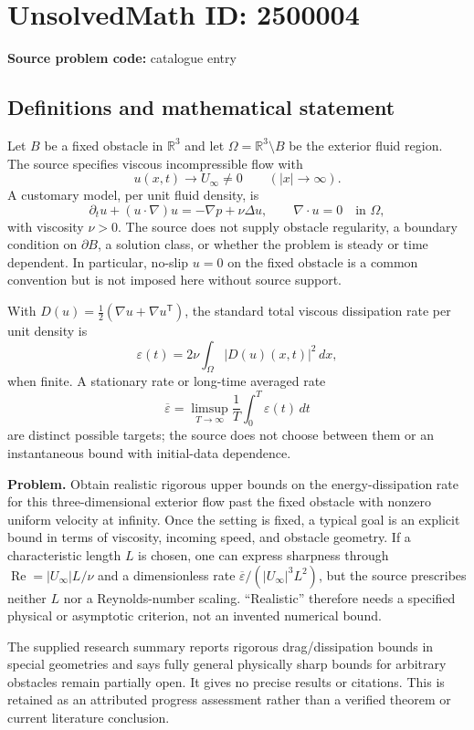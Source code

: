 \documentclass[11pt]{article}
\newcommand{\R}{\mathbb{R}}
\begin{document}
\section*{UnsolvedMath ID: 2500004}
\textbf{Source problem code:} catalogue entry
\subsection{Definitions and mathematical statement}
Let $B$ be a fixed obstacle in $\R^3$ and let $\Omega=\R^3\setminus B$ be the exterior fluid region. The source specifies viscous incompressible flow with
\[
 u(x,t)\longrightarrow U_\infty\ne0\qquad(|x|\to\infty).
\]
A customary model, per unit fluid density, is
\[
 \partial_tu+(u\cdot\nabla)u=-\nabla p+\nu\Delta u,
 \qquad\nabla\cdot u=0\quad\text{in }\Omega,
\]
with viscosity $\nu>0$. The source does not supply obstacle regularity, a boundary condition on $\partial B$, a solution class, or whether the problem is steady or time dependent. In particular, no-slip $u=0$ on the fixed obstacle is a common convention but is not imposed here without source support.

With $D(u)=\tfrac12(\nabla u+\nabla u^{\mathsf T})$, the standard total viscous dissipation rate per unit density is
\[
 \varepsilon(t)=2\nu\int_{\Omega}|D(u)(x,t)|^2\,dx,
\]
when finite. A stationary rate or long-time averaged rate
\[
 \overline\varepsilon=\limsup_{T\to\infty}\frac1T\int_0^T\varepsilon(t)\,dt
\]
are distinct possible targets; the source does not choose between them or an instantaneous bound with initial-data dependence.

\textbf{Problem.} Obtain realistic rigorous upper bounds on the energy-dissipation rate for this three-dimensional exterior flow past the fixed obstacle with nonzero uniform velocity at infinity. Once the setting is fixed, a typical goal is an explicit bound in terms of viscosity, incoming speed, and obstacle geometry. If a characteristic length $L$ is chosen, one can express sharpness through $\operatorname{Re}=|U_\infty|L/\nu$ and a dimensionless rate $\overline\varepsilon/(|U_\infty|^3L^2)$, but the source prescribes neither $L$ nor a Reynolds-number scaling. ``Realistic'' therefore needs a specified physical or asymptotic criterion, not an invented numerical bound.

The supplied research summary reports rigorous drag/dissipation bounds in special geometries and says fully general physically sharp bounds for arbitrary obstacles remain partially open. It gives no precise results or citations. This is retained as an attributed progress assessment rather than a verified theorem or current literature conclusion.
\end{document}
